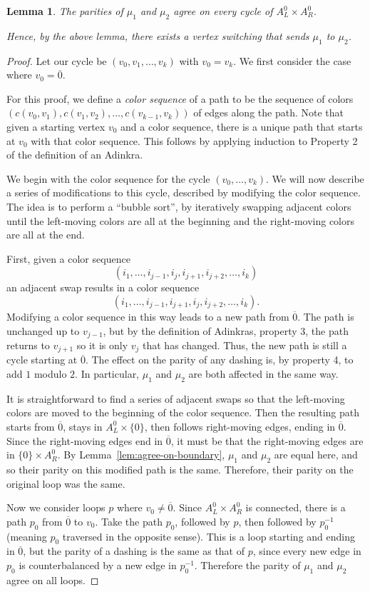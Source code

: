 \documentclass[12pt,twoside,singlespace]{article}
\numberwithin{equation}{section}
\newtheorem{lem}[equation]{Lemma}
\theoremstyle{definition}
\begin{document}
\begin{lem}
\label{lem:switch12}
The parities of $\mu_1$ and $\mu_2$ agree on every cycle of $A_L^0\times A_R^0$.

Hence, by the above lemma, there exists a vertex switching that sends $\mu_1$ to $\mu_2$.
\end{lem}
\begin{proof}
Let our cycle be $(v_0,v_1,\ldots,v_k)$ with $v_0=v_k$.  We first consider the case where $v_0=\overline{0}$.

For this proof, we define a \emph{color sequence} of a path to be the sequence of colors $(c(v_0,v_1),c(v_1,v_2),\ldots,c(v_{k-1},v_k))$ of edges along the path.  Note that given a starting vertex $v_0$ and a color sequence, there is a unique path that starts at $v_0$ with that color sequence.  This follows by applying induction to Property 2 of the definition of an Adinkra.

We begin with the color sequence for the cycle $(v_0,\ldots,v_k)$.  We will now describe a series of modifications to this cycle, described by modifying the color sequence.  The idea is to perform a ``bubble sort'', by iteratively swapping adjacent colors until the left-moving colors are all at the beginning and the right-moving colors are all at the end.

First, given a color sequence
\[(i_1,\ldots,i_{j-1},i_j,i_{j+1},i_{j+2},\ldots,i_k)\]
an adjacent swap results in a color sequence
\[(i_1,\ldots,i_{j-1},i_{j+1},i_j,i_{j+2},\ldots,i_k).\]
Modifying a color sequence in this way leads to a new path from $\overline{0}$.  The path is unchanged up to $v_{j-1}$, but by the definition of Adinkras, property 3, the path returns to $v_{j+1}$ so it is only $v_j$ that has changed.  Thus, the new path is still a cycle starting at $\overline{0}$.  The effect on the parity of any dashing is, by property 4, to add $1$ modulo $2$.  In particular, $\mu_1$ and $\mu_2$ are both affected in the same way.

It is straightforward to find a series of adjacent swaps so that the left-moving colors are moved to the beginning of the color sequence.  Then the resulting path starts from $\overline{0}$, stays in $A_L^0\times\{0\}$, then follows right-moving edges, ending in $\overline{0}$.  Since the right-moving edges end in $\overline{0}$, it must be that the right-moving edges are in $\{0\}\times A_R^0$.  By Lemma~\ref{lem:agree-on-boundary}, $\mu_1$ and $\mu_2$ are equal here, and so their parity on this modified path is the same.  Therefore, their parity on the original loop was the same.

Now we consider loops $p$ where $v_0\not=\overline{0}$.  Since $A_L^0\times A_R^0$ is connected, there is a path $p_0$ from $\overline{0}$ to $v_0$.  Take the path $p_0$, followed by $p$, then followed by $p_0^{-1}$ (meaning $p_0$ traversed in the opposite sense).  This is a loop starting and ending in $\overline{0}$, but the parity of a dashing is the same as that of $p$, since every new edge in $p_0$ is counterbalanced by a new edge in $p_0^{-1}$.  Therefore the parity of $\mu_1$ and $\mu_2$ agree on all loops.
\end{proof}
\end{document}
